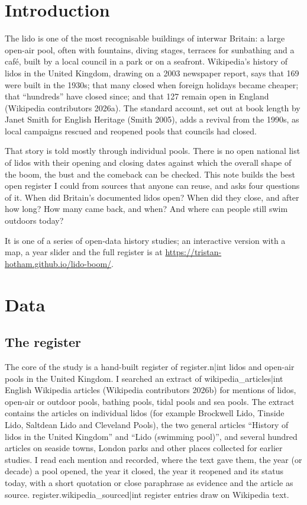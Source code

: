 \documentclass[11pt,a4paper]{article}
\begin{document}
\section{Introduction}

The lido is one of the most recognisable buildings of interwar Britain: a large open-air pool, often with fountains, diving stages, terraces for sunbathing and a café, built by a local council in a park or on a seafront. Wikipedia's history of lidos in the United Kingdom, drawing on a 2003 newspaper report, says that 169 were built in the 1930s; that many closed when foreign holidays became cheaper; that ``hundreds'' have closed since; and that 127 remain open in England (Wikipedia contributors 2026a). The standard account, set out at book length by Janet Smith for English Heritage (Smith 2005), adds a revival from the 1990s, as local campaigns rescued and reopened pools that councils had closed.

That story is told mostly through individual pools. There is no open national list of lidos with their opening and closing dates against which the overall shape of the boom, the bust and the comeback can be checked. This note builds the best open register I could from sources that anyone can reuse, and asks four questions of it. When did Britain's documented lidos open? When did they close, and after how long? How many came back, and when? And where can people still swim outdoors today?

It is one of a series of open-data history studies; an interactive version with a map, a year slider and the full register is at \url{https://tristan-hotham.github.io/lido-boom/}.

\section{Data}

\subsection{The register}

The core of the study is a hand-built register of {{register.n|int}} lidos and open-air pools in the United Kingdom. I searched an extract of {{wikipedia_articles|int}} English Wikipedia articles (Wikipedia contributors 2026b) for mentions of lidos, open-air or outdoor pools, bathing pools, tidal pools and sea pools. The extract contains the articles on individual lidos (for example Brockwell Lido, Tinside Lido, Saltdean Lido and Cleveland Pools), the two general articles ``History of lidos in the United Kingdom'' and ``Lido (swimming pool)'', and several hundred articles on seaside towns, London parks and other places collected for earlier studies. I read each mention and recorded, where the text gave them, the year (or decade) a pool opened, the year it closed, the year it reopened and its status today, with a short quotation or close paraphrase as evidence and the article as source. {{register.wikipedia_sourced|int}} register entries draw on Wikipedia text.
\end{document}
